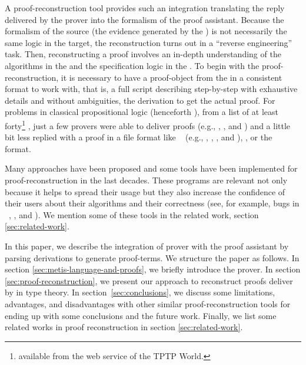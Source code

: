 \documentclass[../main.tex]{subfiles}
\begin{document}
A proof-reconstruction tool provides such an integration translating
the reply delivered by the prover into the formalism of the proof
assistant. Because the formalism of the source (the evidence
generated by the \ATP) is not necessarily the same logic in the
target, the reconstruction turns out in a ``reverse engineering''
task. Then, reconstructing a proof involves an in-depth
understanding of the algorithms in the \ATP and the specification
logic in the \ITP. To begin with the proof-reconstruction, it is
necessary to have a proof-object from the \ATP in a consistent
format to work with, that is, a full script describing step-by-step
with exhaustive details and without ambiguities, the derivation to
get the actual proof.
For problems in classical propositional logic (henceforth \CPL),
from a list of at least forty\footnote{\ATPs available from the web
service  of the TPTP World.} \ATPs, just a few
provers were able to deliver proofs (e.g., 
\cite{Barrett2011}, , and 
\cite{hillenbrand1997}) and a little bit less replied with a proof
in a file format like \TSTP~\cite{sutcliffe2004tstp} (e.g.,
, \Metis, , and ), 
\cite{Stump2008}, or the ~\cite{Bohme2011} format.

Many approaches have been proposed and some tools have been
implemented for proof-reconstruction in the last decades. These
programs are relevant not only because it helps to spread their
usage but they also increase the confidence of their users about
their algorithms and their correctness (see, for example, bugs in
\ATPs~\cite{Keller2013}, \cite{Bohme2011}, \cite{Fleury2014} and
\cite{Kanso2012}). We mention some of these tools in the related work,
section \ref{sec:related-work}.

In this paper, we describe the integration of \Metis prover with the
proof assistant \Agda by parsing \TSTP derivations to generate \Agda
proof-terms. We structure the paper as follows. In section
\ref{sec:metis-language-and-proofs}, we briefly introduce the \Metis
prover. In section \ref{sec:proof-reconstruction}, we present our
approach to reconstruct proofs deliver by \Metis in type theory.
In section~\ref{sec:conclusions}, we discuss
some limitations, advantages, and disadvantages with other similar
proof-reconstruction tools for ending up with some conclusions and
the future work. Finally, we list some related works in proof
reconstruction in section \ref{sec:related-work}.
\end{document}
